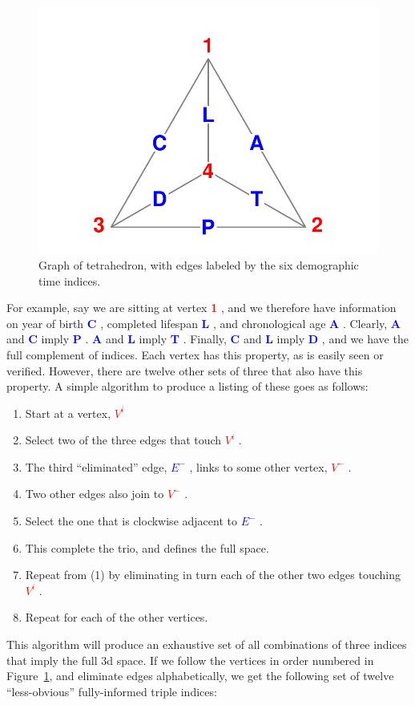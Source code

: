 \documentclass[11pt,oneside]{article} %
\newcommand\vt[1]{%
 \textcolor{red}{\textbf{#1}\hspace{-.3em}}
}
\newcommand\eg[1]{%
 \textcolor{blue}{\textbf{#1}\hspace{-.3em}}
}
\begin{document}
\begin{figure}[h!]
\centering
\caption{Graph of tetrahedron, with edges labeled by the six demographic time
indices.}
\label{fig:tet}
\includegraphics[scale=1]{Figures/TetraHedronVerticesEdges.pdf}
\end{figure}

For example, say we are sitting at vertex \vt{1}, and we therefore have
information on year of birth \eg{C}, completed lifespan \eg{L}, and
chronological age \eg{A}. Clearly, \eg{A} and \eg{C} imply \eg{P}. \eg{A} and
\eg{L} imply \eg{T}. Finally, \eg{C} and \eg{L} imply \eg{D}, and we have the
full complement of indices. Each vertex has this property, as is easily seen or
verified. However, there are twelve other sets of three that also have this
property. A simple algorithm to produce a listing of these goes as follows:
\begin{enumerate}
  \item Start at a vertex, \vt{$V^i$}
  \item Select two of the three edges that touch \vt{$V^i$}.
  \item The third ``eliminated'' edge, \eg{$E^-$}, links to some other vertex,
  \vt{$V^-$}.
  \item Two other edges also join to \vt{$V^-$}.
  \item Select the one that is clockwise adjacent to \eg{$E^-$}.
  \item This complete the trio, and defines the full space.
  \item Repeat from (1) by eliminating in turn each of the other two edges
  touching \vt{$V^i$}.
  \item Repeat for each of the other vertices.
\end{enumerate}
This algorithm will produce an exhaustive set of all combinations of three
indices that imply the full 3d space. If we follow the vertices in order
numbered in Figure~\ref{fig:tet}, and eliminate edges alphabetically, we get the
following set of twelve ``less-obvious'' fully-informed triple indices:
\end{document}
